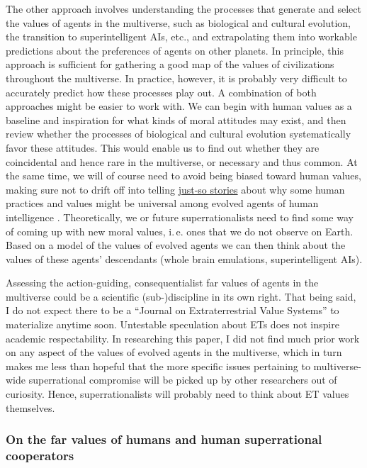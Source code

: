 The other approach involves understanding the processes that generate
and select the values of agents in the multiverse, such as biological
and cultural evolution, the transition to superintelligent AIs, etc.,
and extrapolating them into workable predictions about the preferences
of agents on other planets. In principle, this approach is sufficient
for gathering a good map of the values of civilizations throughout the
multiverse. In practice, however, it is probably very difficult to
accurately predict how these processes play out. A combination of both
approaches might be easier to work with. We can begin with human values
as a baseline and inspiration for what kinds of moral attitudes may
exist, and then review whether the processes of biological and cultural
evolution systematically favor these attitudes. This would enable us to
find out whether they are coincidental and hence rare in the multiverse,
or necessary and thus common. At the same time, we will of course need
to avoid being biased toward human values, making sure not to drift off
into telling
\href{https://en.wikipedia.org/wiki/Just-so_story}{just-so
stories} about why some human practices and values might be universal
among evolved agents of human intelligence
\parencite[chapter 2, section ``Methods for Testing Evolutionary Hypotheses'']{Buss2015-kp}. Theoretically, we or future
superrationalists need to find some way of coming up with new moral
values, i.\,e. ones that we do not observe on Earth. Based on a model of
the values of evolved agents we can then think about the values of these
agents' descendants (whole brain emulations, superintelligent AIs).

Assessing the action-guiding, consequentialist far values of agents in
the multiverse could be a scientific (sub-)discipline in its own right.
That being said, I do not expect there to be a ``Journal on
Extraterrestrial Value Systems'' to materialize anytime soon. Untestable
speculation about ETs does not inspire academic respectability. In
researching this paper, I did not find much prior work on any aspect of
the values of evolved agents in the multiverse, which in turn makes me
less than hopeful that the more specific issues pertaining to
multiverse-wide superrational compromise will be picked up by other
researchers out of curiosity. Hence, superrationalists will probably
need to think about ET values themselves.

\subsubsection{On the far values of humans and human superrational
cooperators}\label{on-the-far-values-of-humans-and-human-superrational-cooperators}

